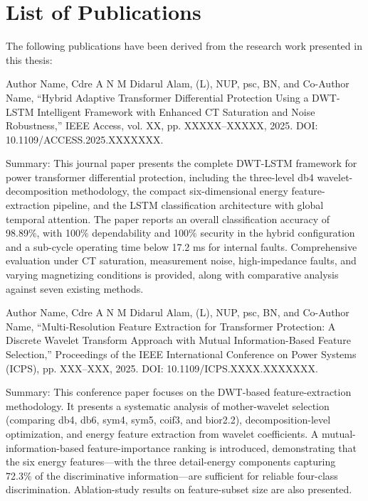 \chapter*{List of Publications}

The following publications have been derived from the research work presented in this thesis:

\cite{ref1} Author Name, Cdre A N M Didarul Alam, (L), NUP, psc, BN, and Co-Author Name, ``Hybrid Adaptive Transformer Differential Protection Using a DWT-LSTM Intelligent Framework with Enhanced CT Saturation and Noise Robustness,'' IEEE Access, vol. XX, pp. XXXXX--XXXXX, 2025. DOI: 10.1109/ACCESS.2025.XXXXXXX.

Summary: This journal paper presents the complete DWT-LSTM framework for power transformer differential protection, including the three-level db4 wavelet-decomposition methodology, the compact six-dimensional energy feature-extraction pipeline, and the LSTM classification architecture with global temporal attention. The paper reports an overall classification accuracy of 98.89\%, with 100\% dependability and 100\% security in the hybrid configuration and a sub-cycle operating time below 17.2 ms for internal faults. Comprehensive evaluation under CT saturation, measurement noise, high-impedance faults, and varying magnetizing conditions is provided, along with comparative analysis against seven existing methods.

\cite{ref2} Author Name, Cdre A N M Didarul Alam, (L), NUP, psc, BN, and Co-Author Name, ``Multi-Resolution Feature Extraction for Transformer Protection: A Discrete Wavelet Transform Approach with Mutual Information-Based Feature Selection,'' Proceedings of the IEEE International Conference on Power Systems (ICPS), pp. XXX--XXX, 2025. DOI: 10.1109/ICPS.XXXX.XXXXXXX.

Summary: This conference paper focuses on the DWT-based feature-extraction methodology. It presents a systematic analysis of mother-wavelet selection (comparing db4, db6, sym4, sym5, coif3, and bior2.2), decomposition-level optimization, and energy feature extraction from wavelet coefficients. A mutual-information-based feature-importance ranking is introduced, demonstrating that the six energy features---with the three detail-energy components capturing 72.3\% of the discriminative information---are sufficient for reliable four-class discrimination. Ablation-study results on feature-subset size are also presented.

